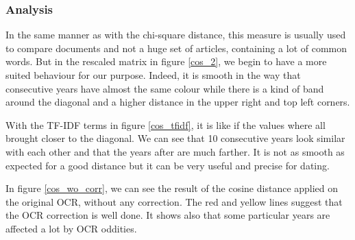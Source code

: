 \subsubsection{Analysis}

In the same manner as with the chi-square distance, this measure is usually used to compare documents and not a huge set of articles, containing a lot of common words. But in the rescaled matrix in figure \ref{cos_2}, we begin to have a more suited behaviour for our purpose. Indeed, it is smooth in the way that consecutive years have almost the same colour while there is a kind of band around the diagonal and a higher distance in the upper right and top left corners.

With the TF-IDF terms in figure \ref{cos_tfidf}, it is like if the values where all brought closer to the diagonal. We can see that 10 consecutive years look similar with each other and that the years after are much farther. It is not as smooth as expected for a good distance but it can be very useful and precise for dating.

In figure \ref{cos_wo_corr}, we can see the result of the cosine distance applied on the original OCR, without any correction. The red and yellow lines suggest that the OCR correction is well done. It shows also that some particular years are affected a lot by OCR oddities.